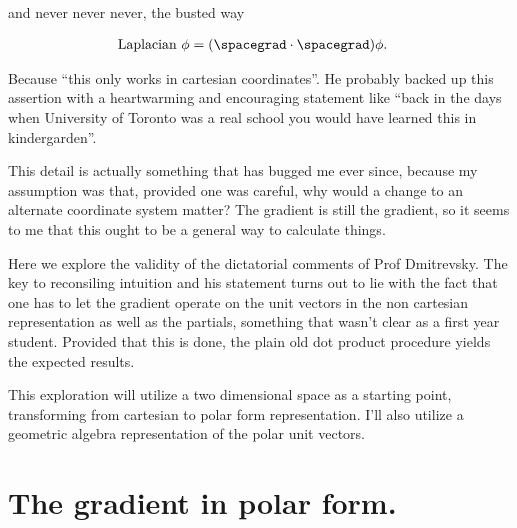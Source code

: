 and never never never, the busted way

\begin{align}\label{eqn:divGradCurLap:3}
\text{Laplacian}\  \phi &= (\spacegrad \cdot \spacegrad) \phi.
\end{align}

Because ``this only works in cartesian coordinates''.  He probably backed up this assertion with a heartwarming and encouraging statement like ``back in the days when University of Toronto was a real school you would have learned this in kindergarden''.

This detail is actually something that has bugged me ever since, because my assumption was that, provided one was careful, why would a change to an alternate coordinate system matter?  The gradient is still the gradient, so it seems to me that this ought to be a general way to calculate things.

Here we explore the validity of the dictatorial comments of Prof Dmitrevsky.  The key to reconsiling intuition and his statement turns out to lie with the fact that one has to let the gradient operate on the unit vectors in the non cartesian representation as well as the partials, something that wasn't clear as a first year student.  Provided that this is done, the plain old dot product procedure yields the expected results.

This exploration will utilize a two dimensional space as a starting point, transforming from cartesian to polar form representation.  I'll also utilize a geometric algebra representation of the polar unit vectors.

\section{The gradient in polar form.}

\EndArticle
